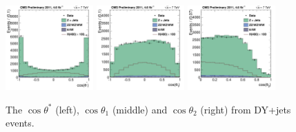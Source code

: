 \begin{figure}[htbp]
   \centering
   \includegraphics[width=0.3\textwidth]{optimization/LHE_study/angle_cosThetaStar.pdf}
   \includegraphics[width=0.3\textwidth]{optimization/LHE_study/angle_cosTheta1.pdf}
   \includegraphics[width=0.3\textwidth]{optimization/LHE_study/angle_cosTheta2.pdf}
   \caption{The $\cos{\theta^*}$ (left), $\cos{\theta_1}$ (middle) and 
$\cos{\theta_2}$ (right) 
from DY+jets events. }
   \label{fig:bkgangle}
\end{figure}


